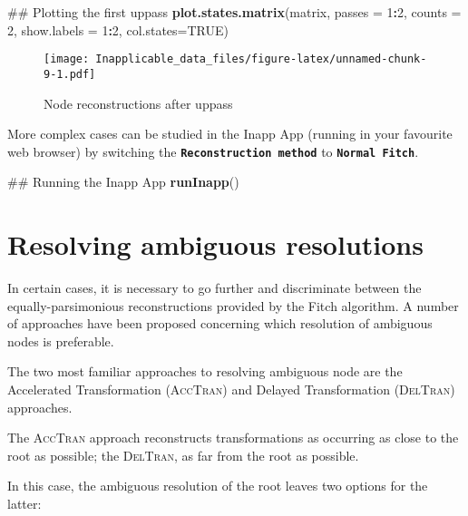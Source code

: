 \documentclass[]{book}
\newenvironment{Shaded}{\begin{snugshade}}{\end{snugshade}}
\newcommand{\KeywordTok}[1]{\textcolor[rgb]{0.13,0.29,0.53}{\textbf{#1}}}
\newcommand{\DataTypeTok}[1]{\textcolor[rgb]{0.13,0.29,0.53}{#1}}
\newcommand{\DecValTok}[1]{\textcolor[rgb]{0.00,0.00,0.81}{#1}}
\newcommand{\OtherTok}[1]{\textcolor[rgb]{0.56,0.35,0.01}{#1}}
\newcommand{\OperatorTok}[1]{\textcolor[rgb]{0.81,0.36,0.00}{\textbf{#1}}}
\newcommand{\NormalTok}[1]{#1}
\theoremstyle{definition}
\theoremstyle{definition}
\theoremstyle{definition}
\theoremstyle{remark}
\begin{document}
\begin{Shaded}
\begin{Highlighting}[]
\NormalTok{## Plotting the first uppass}
\KeywordTok{plot.states.matrix}\NormalTok{(matrix, }\DataTypeTok{passes =} \DecValTok{1}\OperatorTok{:}\DecValTok{2}\NormalTok{, }\DataTypeTok{counts =} \DecValTok{2}\NormalTok{,}
                   \DataTypeTok{show.labels =} \DecValTok{1}\OperatorTok{:}\DecValTok{2}\NormalTok{, }\DataTypeTok{col.states=}\OtherTok{TRUE}\NormalTok{)}
\end{Highlighting}
\end{Shaded}

\begin{figure}
\centering
\texttt{[image: Inapplicable\_data\_files/figure-latex/unnamed-chunk-9-1.pdf]}
\caption{\label{fig:unnamed-chunk-9}Node reconstructions after uppass}
\end{figure}

More complex cases can be studied in the Inapp App (running in your
favourite web browser) by switching the
\textbf{\texttt{Reconstruction\ method}} to
\textbf{\texttt{Normal\ Fitch}}.

\begin{Shaded}
\begin{Highlighting}[]
\NormalTok{## Running the Inapp App}
\KeywordTok{runInapp}\NormalTok{()}
\end{Highlighting}
\end{Shaded}

\hypertarget{resolving-ambiguous-resolutions}{%
\section{Resolving ambiguous
resolutions}\label{resolving-ambiguous-resolutions}}

In certain cases, it is necessary to go further and discriminate between
the equally-parsimonious reconstructions provided by the Fitch
algorithm. A number of approaches have been proposed concerning which
resolution of ambiguous nodes is preferable.

The two most familiar approaches to resolving ambiguous node are the
Accelerated Transformation (\textsc{AccTran}) and Delayed Transformation
(\textsc{DelTran}) approaches.

The \textsc{AccTran} approach reconstructs transformations as occurring
as close to the root as possible; the \textsc{DelTran}, as far from the
root as possible.

In this case, the ambiguous resolution of the root leaves two options
for the latter:
\end{document}
